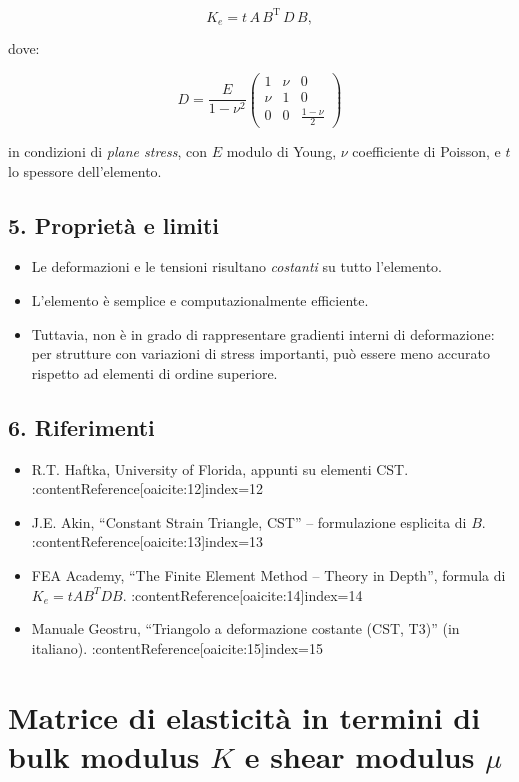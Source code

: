 \documentclass{article}
\begin{document}
\[
K_e = t\, A\, B^\mathrm{T}\, D\, B,
\]

dove:

\[
D = \frac{E}{1-\nu^2}
\begin{pmatrix}
1 & \nu & 0\\
\nu & 1 & 0\\
0 & 0 & \frac{1-\nu}{2}
\end{pmatrix}
\]

in condizioni di \emph{plane stress}, con \(E\) modulo di Young, \(\nu\) coefficiente di Poisson, e \(t\) lo spessore dell’elemento.

\subsection*{5. Proprietà e limiti}
\begin{itemize}
  \item Le deformazioni e le tensioni risultano \emph{costanti} su tutto l’elemento.  
  \item L’elemento è semplice e computazionalmente efficiente.  
  \item Tuttavia, non è in grado di rappresentare gradienti interni di deformazione: per strutture con variazioni di stress importanti, può essere meno accurato rispetto ad elementi di ordine superiore.  
\end{itemize}

\subsection*{6. Riferimenti}
\begin{itemize}
  \item R.T. Haftka, University of Florida, appunti su elementi CST. :contentReference[oaicite:12]{index=12}  
  \item J.E. Akin, “Constant Strain Triangle, CST” – formulazione esplicita di \(B\). :contentReference[oaicite:13]{index=13}  
  \item FEA Academy, “The Finite Element Method – Theory in Depth”, formula di \(K_e = t A B^T D B\). :contentReference[oaicite:14]{index=14}  
  \item Manuale Geostru, “Triangolo a deformazione costante (CST, T3)” (in italiano). :contentReference[oaicite:15]{index=15}  
\end{itemize}



\section*{Matrice di elasticità in termini di bulk modulus $K$ e shear modulus $\mu$}
\end{document}
